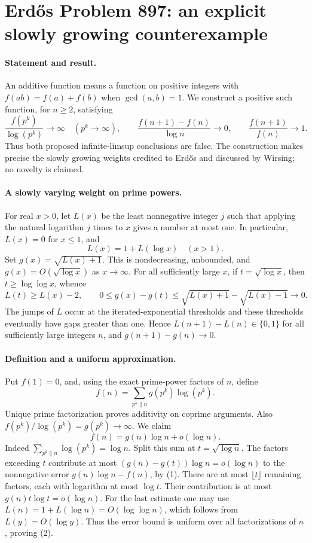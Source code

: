 \section*{Erd\H{o}s Problem 897: an explicit slowly growing counterexample}

\paragraph{Statement and result.}
An additive function means a function on positive integers
with \(f(ab)=f(a)+f(b)\) when \(\gcd(a,b)=1\).
We construct a positive such function, for \(n\geq2\), satisfying
\[
 \frac{f(p^k)}{\log(p^k)}\longrightarrow\infty
 \quad(p^k\longrightarrow\infty),
 \qquad
 \frac{f(n+1)-f(n)}{\log n}\longrightarrow0,
 \qquad
 \frac{f(n+1)}{f(n)}\longrightarrow1.
\]
Thus both proposed infinite-limsup conclusions are false.
The construction makes precise the slowly growing weights
credited to Erd\H{o}s and discussed by Wirsing; no novelty is claimed.

\paragraph{A slowly varying weight on prime powers.}
For real \(x>0\), let \(L(x)\) be the least nonnegative
integer \(j\) such that applying the natural logarithm \(j\)
times to \(x\) gives a number at most one. In particular,
\(L(x)=0\) for \(x\leq1\), and
\[
 L(x)=1+L(\log x)\quad(x>1).
\]
Set \(g(x)=\sqrt{L(x)+1}\). This is nondecreasing,
unbounded, and \(g(x)=O(\sqrt{\log x})\) as \(x\to\infty\).
For all sufficiently large \(x\), if \(t=\sqrt{\log x}\), then
\(t\geq\log\log x\), whence
\[
 L(t)\geq L(x)-2,\qquad
 0\leq g(x)-g(t)
 \leq\sqrt{L(x)+1}-\sqrt{L(x)-1}\longrightarrow0.
\tag{1}
\]
The jumps of \(L\) occur at the iterated-exponential thresholds
and these thresholds eventually have gaps greater than one.
Hence \(L(n+1)-L(n)\in\{0,1\}\) for all sufficiently large
integers \(n\), and \(g(n+1)-g(n)\to0\).

\paragraph{Definition and a uniform approximation.}
Put \(f(1)=0\), and, using the exact prime-power factors of \(n\), define
\[
 f(n)=\sum_{p^k\parallel n}g(p^k)\log(p^k).
\]
Unique prime factorization proves additivity on coprime arguments.
Also \(f(p^k)/\log(p^k)=g(p^k)\to\infty\).
We claim
\[
 f(n)=g(n)\log n+o(\log n).
\tag{2}
\]
Indeed \(\sum_{p^k\parallel n}\log(p^k)=\log n\).
Split this sum at \(t=\sqrt{\log n}\).
The factors exceeding \(t\) contribute at most
\((g(n)-g(t))\log n=o(\log n)\) to the nonnegative error
\(g(n)\log n-f(n)\), by (1).
There are at most \(\lfloor t\rfloor\) remaining factors,
each with logarithm at most \(\log t\). Their contribution
is at most \(g(n)t\log t=o(\log n)\).
For the last estimate one may use
\(L(n)=1+L(\log n)=O(\log\log n)\), which follows from
\(L(y)=O(\log y)\). Thus the error bound is uniform over
all factorizations of \(n\), proving (2).

